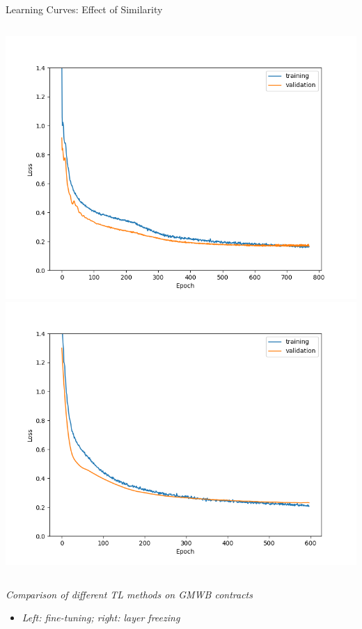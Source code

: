 \documentclass[9pt,handout]{beamer}
\begin{document}
    \begin{frame}{Learning Curves: Effect of Similarity}
    \begin{columns}
    \includegraphics[height=0.8\textheight]{../project3/figures/figure4c.png}
    \includegraphics[height=0.8\textheight]{../project3/figures/figure4d.png}
    \end{columns}
    
    \textit{Comparison of different TL methods on GMWB contracts}
    \begin{itemize}
        \item \textit{Left: fine-tuning; right: layer freezing}
    \end{itemize}
    \end{frame}
    
\end{document}
